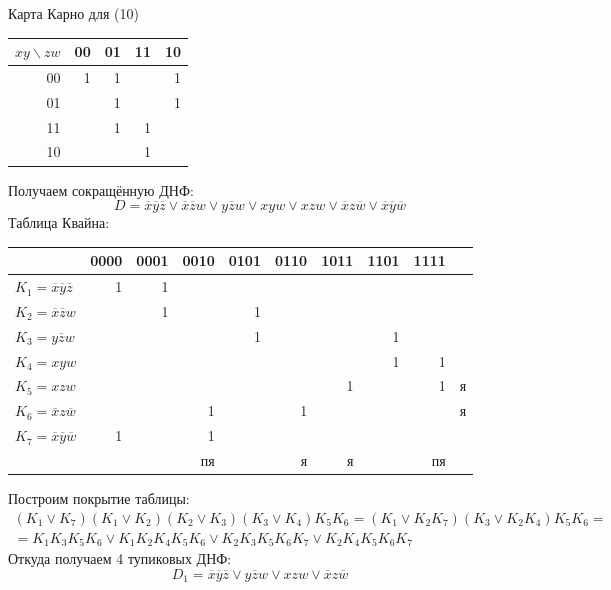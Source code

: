 \documentclass[11pt]{article}
\begin{document}
Карта Карно для (10)
\begin{center}
\begin{tabular}{rrrrr}
\hline
\(xy\backslash zw\) & 00 & 01 & 11 & 10\\
\hline
00 & 1 & 1 &  & 1\\
01 &  & 1 &  & 1\\
11 &  & 1 & 1 & \\
10 &  &  & 1 & \\
\hline
\end{tabular}
\end{center}
Получаем сокращённую ДНФ:
\begin{equation}
D = \overline{x}\overline{y}\overline{z} \vee \overline{x}\overline{z}w \vee y\overline{z}w \vee
xyw \vee xzw \vee \overline{x}z\overline{w} \vee \overline{x}\overline{y}\overline{w}
\end{equation}
Таблица Квайна:
\begin{center}
\begin{tabular}{lrrrrrrrrl}
\hline
 & 0000 & 0001 & 0010 & 0101 & 0110 & 1011 & 1101 & 1111 & \\
\hline
\(K_1 = \overline{x}\overline{y}\overline{z}\) & 1 & 1 &  &  &  &  &  &  & \\
\(K_2 = \overline{x}\overline{z}w\) &  & 1 &  & 1 &  &  &  &  & \\
\(K_3 = y\overline{z}w\) &  &  &  & 1 &  &  & 1 &  & \\
\(K_4 = xyw\) &  &  &  &  &  &  & 1 & 1 & \\
\(K_5 = xzw\) &  &  &  &  &  & 1 &  & 1 & я\\
\(K_6 = \overline{x}z\overline{w}\) &  &  & 1 &  & 1 &  &  &  & я\\
\(K_7 = \overline{x}\overline{y}\overline{w}\) & 1 &  & 1 &  &  &  &  &  & \\
\hline
 &  &  & пя &  & я & я &  & пя & \\
\hline
\end{tabular}
\end{center}
Построим покрытие таблицы:
\begin{multline}
(K_1 \vee K_7)(K_1 \vee K_2)(K_2 \vee K_3)(K_3 \vee K_4)K_5K_6 = (K_1 \vee K_2K_7)(K_3 \vee K_2K_4)K_5K_6 = \\
= K_1K_3K_5K_6 \vee K_1K_2K_4K_5K_6 \vee K_2K_3K_5K_6K_7 \vee K_2K_4K_5K_6K_7
\end{multline}
Откуда получаем 4 тупиковых ДНФ:
\begin{equation}
D_1 = \overline{x}\overline{y}\overline{z} \vee y\overline{z}w \vee xzw \vee \overline{x}z\overline{w}
\end{equation}
\end{document}
